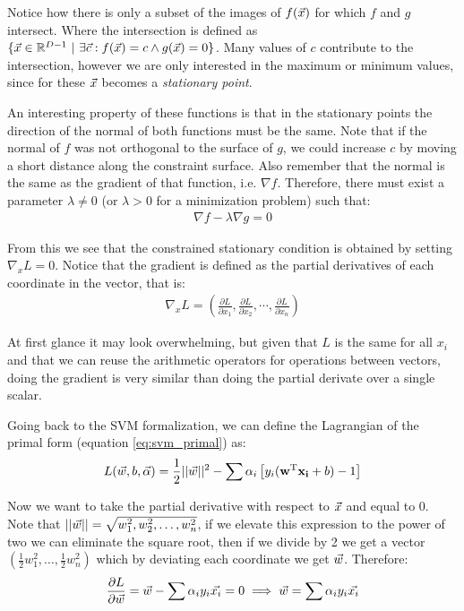 Notice how there is only a subset of the images of $f(\vec{x})$ for which $f$ and $g$ inter\-sect. Where the intersection is defined as $\{\vec{x} \in \mathbb{R}^{D-1}\ |\ \exists \vec{c} : f(\vec{x}) = c \land g(\vec{x}) = 0\}$. Many values of $c$ contribute to the intersection, however we are only interested in the maximum or minimum values, since for these $\vec{x}$ becomes a \emph{stationary point}.

An interesting property of these functions is that in the stationary points the di\-rec\-tion of the normal of both functions must be the same. Note that if the normal of $f$ was not orthogonal to the surface of $g$, we could increase $c$ by moving a short distance along the constraint surface. Also remember that the normal is the same as the gradient of that function, i.e. $\nabla f$. Therefore, there must exist a parameter $\lambda \neq 0$ (or $\lambda > 0$ for a minimization problem) such that:
\begin{align}
    \nabla f - \lambda \nabla g = 0
\end{align}

From this we see that the constrained stationary condition is obtained by setting $\nabla_x L = 0$. Notice that the gradient is defined as the partial derivatives of each coordinate in the vector, that is:
\begin{align*}
    \nabla_x L = \left( \frac{\partial L}{\partial x_1}, \frac{\partial L}{\partial x_2}, \cdots, \frac{\partial L}{\partial x_n} \right)
\end{align*}

At first glance it may look overwhelming, but given that $L$ is the same for all $x_i$ and that we can reuse the arithmetic operators for operations between vectors, doing the gradient is very similar than doing the partial derivate over a single scalar. 

Going back to the SVM formalization, we can define the Lagrangian of the primal form (equation \ref{eq:svm_primal}) as:
\begin{align}\label{eq:svm_lagrangian_from_primal}
    L(\vec{w}, b, \vec{\alpha}) = \frac{1}{2} ||\vec{w}||^2 - \sum \alpha_i \left[ y_i (\mathbf{w}^{\text{T}} \mathbf{x_i} + b) - 1\right]
\end{align}

Now we want to take the partial derivative with respect to $\vec{x}$ and equal to 0. Note that $||\vec{w}|| = \sqrt{w_1^2, w_2^2, \dots, w_n^2}$, if we elevate this expression to the power of two we can eliminate the square root, then if we divide by 2 we get a vector $\left( \frac{1}{2} w_1^2, \dots, \frac{1}{2} w_n^2 \right)$ which by deviating each coordinate we get $\vec{w}$. Therefore:
\begin{align}
    \frac{\partial L}{\partial \vec{w}} = \vec{w} - \sum \alpha_i y_i \vec{x_i} = 0 \implies \vec{w} = \sum \alpha_i y_i \vec{x_i}
\end{align}

